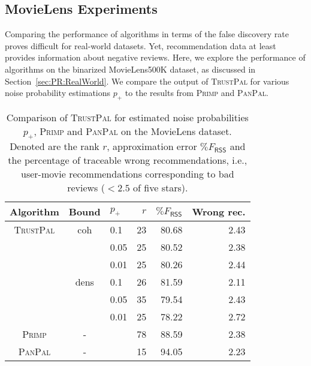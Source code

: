 \subsection{MovieLens Experiments}
Comparing the performance of algorithms in terms of the false discovery rate proves difficult for real-world datasets. Yet, recommendation data at least provides information about negative reviews. Here, we explore the performance of algorithms on the binarized MovieLens500K dataset, as discussed in Section~\ref{sec:PR:RealWorld}. We compare the output of \textsc{TrustPal} for various noise probability estimations $p_+$ to the results from \textsc{Primp} and \textsc{PanPal}.
\begin{table}
\centering
	\begin{tabular}{cclrrr}\toprule
     Algorithm & Bound& $p_+$& $r$ & $\%F_{\mathsf{RSS}}$ & Wrong rec.\\ \midrule
\textsc{TrustPal} & coh & 0.1	&23	&80.68	&2.43\\
 & & 0.05	&25	&80.52	&2.38\\
 & & 0.01	&25	&80.26	&2.44\\
 & dens & 0.1	&26	&81.59	&2.11\\
 & & 0.05	&35	&79.54	&2.43\\
 & & 0.01	&25	&78.22	&2.72\\
\textsc{Primp} &-&& 78 & 88.59 & 2.38\\
\textsc{PanPal} &-&& 15 & 94.05 & 2.23\\
\bottomrule
\end{tabular}
\caption{Comparison of \textsc{TrustPal} for estimated noise probabilities $p_+$, \textsc{Primp} and \textsc{PanPal} on the MovieLens dataset. Denoted are the rank $r$, approximation error $\%F_{\mathsf{RSS}}$ and the percentage of traceable wrong recommendations, i.e., user-movie recommendations corresponding to bad reviews ($<2.5$ of five stars).}
\label{tbl:TP:movielens}
\end{table}

